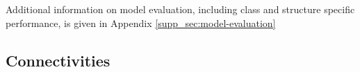\begin{comment}
\begin{tabular}{ll|rrrrr}
\toprule
   & Estimator &     EL &     NW & Average &     NW &  NW-wt \\
   & Smoothing &     SS & Cre-SS &  Cre-SS &     SS &      M \\
   & Target &     SS &     SS &      SS &     SS &     SS \\
Structure & \# Eval exps &        &        &         &        &        \\
\midrule
\hline
CB & 10 &  0.044 &  0.081 &   0.081 &  0.058 &  0.439 \\
CTXsp & 2 &  0.497 &  0.497 &   0.497 &  0.497 &  0.000 \\
HPF & 79 &  0.122 &  0.140 &   0.143 &  0.155 &  0.471 \\
HY & 41 &  0.241 &  0.266 &   0.269 &  0.244 &  1.019 \\
Isocortex & 838 &  0.173 &  0.195 &   0.202 &  0.234 &  0.404 \\
MB & 23 &  0.151 &  0.151 &   0.166 &  0.139 &  0.759 \\
MY & 7 &  0.186 &  0.233 &   0.233 &  0.184 &  0.452 \\
OLF & 17 &  0.069 &  0.095 &   0.100 &  0.073 &  0.110 \\
P & 8 &  0.236 &  0.239 &   0.239 &  0.264 &  0.984 \\
PAL & 11 &  0.190 &  0.198 &   0.198 &  0.260 &  1.401 \\
STR & 45 &  0.084 &  0.088 &   0.089 &  0.097 &  0.265 \\
TH & 29 &  0.351 &  0.678 &   0.678 &  0.365 &  1.088 \\
\bottomrule
\end{tabular}
\caption{Weighted losses with summary structure targets.}
\label{tab:loss}


\end{comment}

Additional information on model evaluation, including class and structure specific performance, is given in Appendix \ref{supp_sec:model-evaluation}

\newpage

\subsection{Connectivities}

